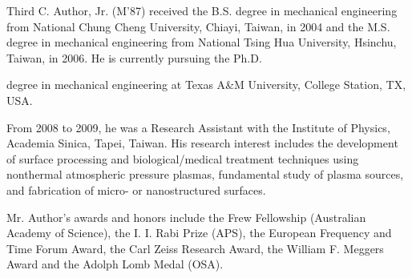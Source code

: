 \documentclass[journal,twoside,web]{ieeecolor2}
\begin{document}
\begin{IEEEbiography}{Third C. Author, Jr.} (M'87) received the B.S. degree in mechanical 
engineering from National Chung Cheng University, Chiayi, Taiwan, in 2004 
and the M.S.
degree in mechanical engineering from National Tsing Hua 
University, Hsinchu, Taiwan, in 2006.
He is currently pursuing the Ph.D.

degree in mechanical engineering at Texas A{\&}M University, College 
Station, TX, USA.

From 2008 to 2009, he was a Research Assistant with the Institute of 
Physics, Academia Sinica, Tapei, Taiwan.
His research interest includes the 
development of surface processing and biological/medical treatment 
techniques using nonthermal atmospheric pressure plasmas, fundamental study 
of plasma sources, and fabrication of micro- or nanostructured surfaces.


Mr.
Author's awards and honors include the Frew Fellowship (Australian 
Academy of Science), the I.
I.
Rabi Prize (APS), the European Frequency and 
Time Forum Award, the Carl Zeiss Research Award, the William F.
Meggers 
Award and the Adolph Lomb Medal (OSA).
\end{IEEEbiography}
\end{document}
